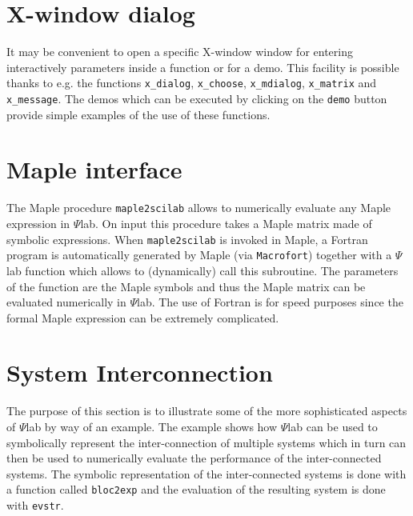 \section{X-window dialog}
It may be convenient to open a specific X-window window for entering
interactively parameters inside a function or for a demo.
This facility is possible thanks to e.g. the functions \verb!x_dialog!,
\verb!x_choose!, \verb!x_mdialog!, \verb!x_matrix! and \verb!x_message!.
The demos which can be executed by clicking on the {\tt demo} button
provide simple examples of the use of these functions.

\section{Maple interface}
The Maple procedure {\tt maple2scilab} allows to numerically evaluate
any Maple expression in $\Psi$lab.
On input this procedure takes a Maple matrix made of symbolic
expressions. When {\tt maple2scilab} is invoked in Maple,
a Fortran program is automatically generated by Maple 
(via {\tt Macrofort}) together with a $\Psi$lab function which 
allows to (dynamically) call this subroutine.
The parameters of the function are the Maple symbols and thus the Maple
matrix can be evaluated numerically in $\Psi$lab. The use of Fortran
is for speed purposes since the formal Maple expression can be
extremely complicated.

\section{System Interconnection}
	The purpose of this section is to illustrate some
of the more sophisticated aspects of $\Psi$lab by way of an example.
The example shows how $\Psi$lab can be used to symbolically represent
the inter-connection of multiple systems which in turn can 
then be used to numerically evaluate the performance of the
inter-connected systems.  The symbolic representation of the
inter-connected systems is done with a function called {\tt bloc2exp}
and the evaluation of the resulting system is done with
{\tt evstr}.

